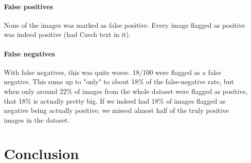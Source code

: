 \documentclass[
  digital,     %
  oneside,     %
  nosansbold,  %
  nocolorbold, %
  nolof,         %
  nolot,         %
]{fithesis4}
\begin{document}
\subsubsection{False positives}
None of the images was marked as false positive. Every image flagged as positive was indeed positive (had Czech text in it).

\subsubsection{False negatives}
With false negatives, this was quite worse. 18/100 were flagged as a false negative. This sums up to "only" to about 18\% of the false-negative rate, but when only around 22\% of images from the whole dataset were flagged as positive, that 18\% is actually pretty big. If we indeed had 18\% of images flagged as negative being actually positive, we missed almost half of the truly positive images in the dataset.

\chapter{Conclusion}
\end{document}
